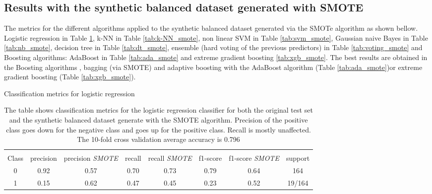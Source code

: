\documentclass[11pt]{article}
\theoremstyle{definition}
\theoremstyle{remark}
\begin{document}
\subsection{Results with the synthetic balanced dataset generated with SMOTE}
\label{se:resimbalance}

The metrics for the different algorithms applied to the synthetic balanced dataset generated via the SMOTe algorithm as shown bellow.
Logistic regression in Table \ref{tab:logreg_smote}, k-NN in Table \ref{tab:k-NN_smote}, non linear SVM in Table \ref{tab:svm_smote}, Gaussian naive Bayes in Table \ref{tab:nb_smote}, decision tree in Table \ref{tab:dt_smote}, ensemble (hard voting of the previous predictors) in Table \ref{tab:voting_smote} and Boosting algorithms: AdaBoost in Table \ref{tab:ada_smote} and extreme gradient boosting \ref{tab:xgb_smote}.
The best results are obtained in the Boosting algorithms , bagging (via SMOTE) and adaptive boosting with the AdaBoost algorithm (Table \ref{tab:ada_smote})or extreme gradient boosting (Table \ref{tab:xgb_smote}). 

\begin{table}[H]
\caption{Classification metrics for logistic regression} \label{tab:logreg_smote} 
\begin{center} 
\begin{tabular}{cccccccc}
\hline
\multicolumn{1}{c}{} \\
Class & precision & precision \textit{SMOTE}& recall & recall \textit{SMOTE}& f1-score & f1-score \textit{SMOTE} & support     \\
\hline
0 & 0.92  &  0.57 &  0.70  & 0.73 &   0.79   &  0.64 &  164 \\
1 & 0.15  &  0.62 &  0.47 &  0.45  &  0.23   &  0.52  &  19/164 \\
\hline
\end{tabular}
\caption{The table shows classification metrics for the logistic regression classifier for both the original test set and the synthetic balanced dataset generate with the SMOTE algorithm. Precision of the positive class goes down for the negative class and goes up for the positive class. Recall is mostly unaffected. The 10-fold cross validation average accuracy is 0.796}
\end{center}
\end{table}
\end{document}
